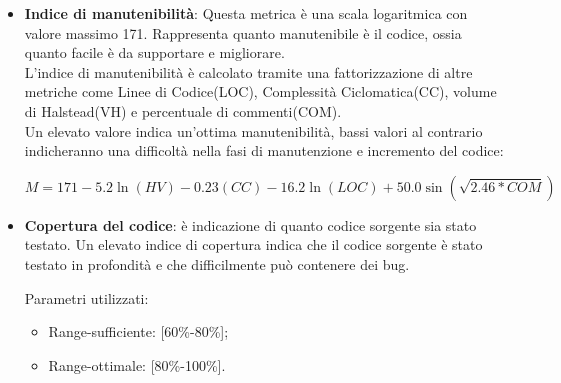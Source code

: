{{\begin{itemize}
\begin{itemize}
	    \end{itemize}
	    Successivamente possono essere calcolati i seguenti valori:
	    \begin{itemize}
		\item \textbf{Program length:} \[N = N1 + N2\]
		\item \textbf{Program vocabulary:} \[n = n1 + n2\]
	    \item \textbf{Volume:} il volume descrive la dimensione dell’implementazione di un algoritmo e si basa sul numero di operazioni eseguite e sugli operandi di una funzione. Il volume di una function senza parametri composta da una sola linea è 20, mentre un indice superiore a 1000 indica che probabilmente la funzione esegue troppe operazioni. \[V= N \times \log_2(n)\]
	      \textbf{Parametri utilizzati}
	      \begin{itemize}
	       \item Range-accettazione: [20-1500];
	       \item Range-ottimale: [20-1000];
	      \end{itemize}
		\end{itemize}
		\item \textbf{Indice di manutenibilità}: Questa metrica è una scala logaritmica con valore massimo 171. Rappresenta quanto manutenibile è il codice, ossia quanto facile è da supportare e migliorare.\\
		L'indice di manutenibilità è calcolato tramite una fattorizzazione di altre metriche come Linee di Codice(LOC), Complessità Ciclomatica(CC), volume di Halstead(VH) e percentuale di commenti(COM).\\
		Un elevato valore indica un'ottima manutenibilità, bassi valori al contrario indicheranno una difficoltà nella fasi di manutenzione e incremento del codice:
		
		\[M= 171 -5.2\ln(HV) -0.23(CC) -16.2\ln(LOC) +50.0\sin(\sqrt{2.46*COM})\]

		
		\item \textbf{Copertura del codice}: è indicazione di quanto codice sorgente sia stato testato. Un elevato indice di copertura indica che il codice sorgente è stato testato in profondità e che difficilmente può contenere dei bug.
		
		Parametri utilizzati:
		\begin{itemize}
		\item Range-sufficiente: [60\%-80\%];
		\item Range-ottimale: [80\%-100\%].
		\end{itemize}
	\end{itemize}
	}
}
